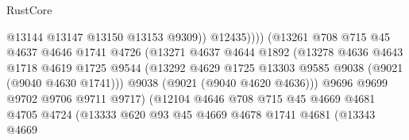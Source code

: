 \begin{lexlean}{RustCore}
\begin{coremodule}
                                            @13144
                                            @13147
                                            @13150
                                            @13153
                                            @9309))
                                        @12435))))
                                (@13261
                                  @708
                                  @715
                                  @45
                                  @4637
                                  @4646
                                  @1741
                                  @4726
                                  (@13271
                                    @4637
                                    @4644
                                    @1892
                                    (@13278
                                      @4636
                                      @4643
                                      @1718
                                      @4619
                                      @1725
                                      @9544
                                      (@13292
                                        @4629
                                        @1725
                                        @13303
                                        @9585
                                        @9038
                                        (@9021 (@9040 @4630 @1741)))
                                      @9038
                                      (@9021 (@9040 @4620 @4636)))
                                    @9696
                                    @9699
                                    @9702
                                    @9706
                                    @9711
                                    @9717)
                                  (@12104
                                    @4646
                                    @708
                                    @715
                                    @45
                                    @4669
                                    @4681
                                    @4705
                                    @4724
                                    (@13333
                                      @620
                                      @93
                                      @45
                                      @4669
                                      @4678
                                      @1741
                                      @4681
                                      (@13343
                                        @4669

\end{coremodule}
\end{lexlean}
